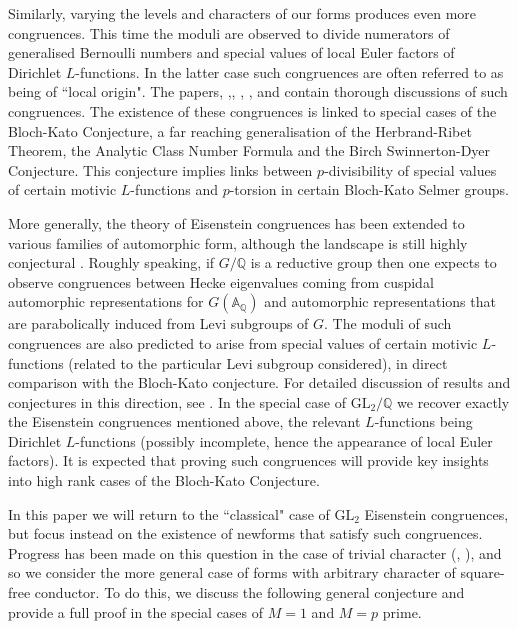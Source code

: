\documentclass{amsart}
\theoremstyle{plain}
\theoremstyle{definition}
\begin{document}
Similarly, varying the levels and characters of our forms produces even more congruences. This time the moduli are observed to divide numerators of generalised Bernoulli numbers and special values of local Euler factors of Dirichlet $L$-functions. In the latter case such congruences are often referred to as being of ``local origin". The papers, \cite{mazur},\cite{dummigan_2007}, \cite{dummigan_fretwell_2014}, \cite{billerey_menares_2016}, \cite{billerey_menares_2017} and \cite{spencer_2018} contain thorough discussions of such congruences. The existence of these congruences is linked to special cases of the Bloch-Kato Conjecture, a far reaching generalisation of the Herbrand-Ribet Theorem, the Analytic Class Number Formula and the Birch Swinnerton-Dyer Conjecture. This conjecture implies links between $p$-divisibility of special values of certain motivic $L$-functions and $p$-torsion in certain Bloch-Kato Selmer groups.

More generally, the theory of Eisenstein congruences has been extended to various families of automorphic form, although the landscape is still highly conjectural \cite{harder}. Roughly speaking, if $G/\mathbb{Q}$ is a reductive group then one expects to observe congruences between Hecke eigenvalues coming from cuspidal automorphic representations for $G(\mathbb{A}_{\mathbb{Q}})$ and automorphic representations that are parabolically induced from Levi subgroups of $G$. The moduli of such congruences are also predicted to arise from special values of certain motivic $L$-functions (related to the particular Levi subgroup considered), in direct comparison with the Bloch-Kato conjecture. For detailed discussion of results and conjectures in this direction, see \cite{bergstrom}. In the special case of $\text{GL}_2/\mathbb{Q}$ we recover exactly the Eisenstein congruences mentioned above, the relevant $L$-functions being Dirichlet $L$-functions (possibly incomplete, hence the appearance of local Euler factors). It is expected that proving such congruences will provide key insights into high rank cases of the Bloch-Kato Conjecture.

In this paper we will return to the ``classical" case of $\text{GL}_2$ Eisenstein congruences, but focus instead on the existence of newforms that satisfy such congruences. Progress has been made on this question in the case of trivial character (\cite{billerey_menares_2016}, \cite{dummigan_fretwell_2014}), and so we consider the more general case of forms with arbitrary character of square-free conductor. To do this, we discuss the following general conjecture and provide a full proof in the special cases of $M=1$ and $M=p$ prime. 
\end{document}
